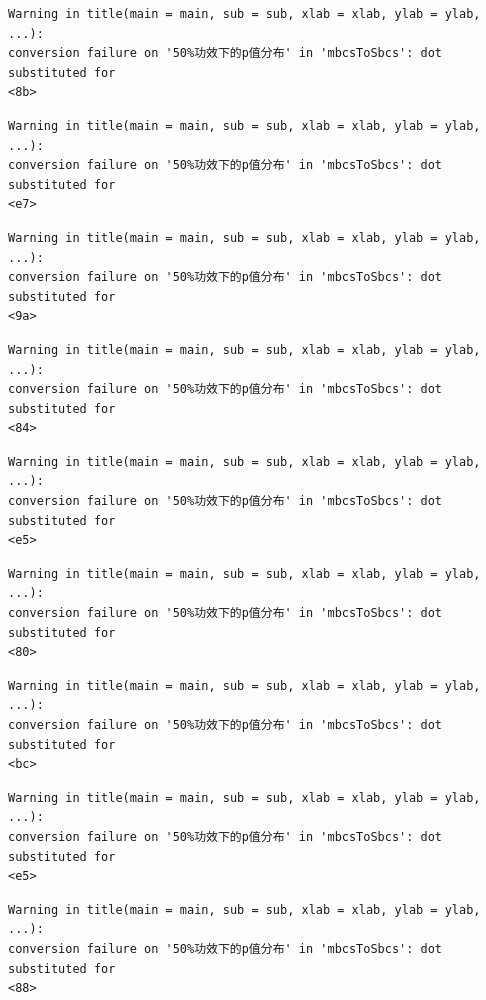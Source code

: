 \documentclass[
  letterpaper,
  DIV=11,
  numbers=noendperiod]{scrreprt}
\begin{document}
\begin{verbatim}
Warning in title(main = main, sub = sub, xlab = xlab, ylab = ylab, ...):
conversion failure on '50%功效下的p值分布' in 'mbcsToSbcs': dot substituted for
<8b>
\end{verbatim}

\begin{verbatim}
Warning in title(main = main, sub = sub, xlab = xlab, ylab = ylab, ...):
conversion failure on '50%功效下的p值分布' in 'mbcsToSbcs': dot substituted for
<e7>
\end{verbatim}

\begin{verbatim}
Warning in title(main = main, sub = sub, xlab = xlab, ylab = ylab, ...):
conversion failure on '50%功效下的p值分布' in 'mbcsToSbcs': dot substituted for
<9a>
\end{verbatim}

\begin{verbatim}
Warning in title(main = main, sub = sub, xlab = xlab, ylab = ylab, ...):
conversion failure on '50%功效下的p值分布' in 'mbcsToSbcs': dot substituted for
<84>
\end{verbatim}

\begin{verbatim}
Warning in title(main = main, sub = sub, xlab = xlab, ylab = ylab, ...):
conversion failure on '50%功效下的p值分布' in 'mbcsToSbcs': dot substituted for
<e5>
\end{verbatim}

\begin{verbatim}
Warning in title(main = main, sub = sub, xlab = xlab, ylab = ylab, ...):
conversion failure on '50%功效下的p值分布' in 'mbcsToSbcs': dot substituted for
<80>
\end{verbatim}

\begin{verbatim}
Warning in title(main = main, sub = sub, xlab = xlab, ylab = ylab, ...):
conversion failure on '50%功效下的p值分布' in 'mbcsToSbcs': dot substituted for
<bc>
\end{verbatim}

\begin{verbatim}
Warning in title(main = main, sub = sub, xlab = xlab, ylab = ylab, ...):
conversion failure on '50%功效下的p值分布' in 'mbcsToSbcs': dot substituted for
<e5>
\end{verbatim}

\begin{verbatim}
Warning in title(main = main, sub = sub, xlab = xlab, ylab = ylab, ...):
conversion failure on '50%功效下的p值分布' in 'mbcsToSbcs': dot substituted for
<88>
\end{verbatim}
\end{document}
